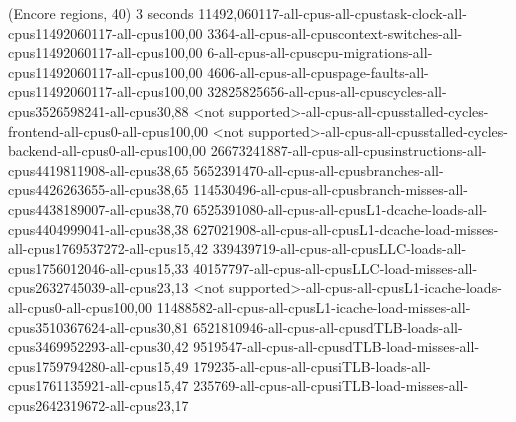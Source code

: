 (Encore regions, 40)
3 seconds
11492,060117-all-cpus-all-cpustask-clock-all-cpus11492060117-all-cpus100,00
3364-all-cpus-all-cpuscontext-switches-all-cpus11492060117-all-cpus100,00
6-all-cpus-all-cpuscpu-migrations-all-cpus11492060117-all-cpus100,00
4606-all-cpus-all-cpuspage-faults-all-cpus11492060117-all-cpus100,00
32825825656-all-cpus-all-cpuscycles-all-cpus3526598241-all-cpus30,88
<not supported>-all-cpus-all-cpusstalled-cycles-frontend-all-cpus0-all-cpus100,00
<not supported>-all-cpus-all-cpusstalled-cycles-backend-all-cpus0-all-cpus100,00
26673241887-all-cpus-all-cpusinstructions-all-cpus4419811908-all-cpus38,65
5652391470-all-cpus-all-cpusbranches-all-cpus4426263655-all-cpus38,65
114530496-all-cpus-all-cpusbranch-misses-all-cpus4438189007-all-cpus38,70
6525391080-all-cpus-all-cpusL1-dcache-loads-all-cpus4404999041-all-cpus38,38
627021908-all-cpus-all-cpusL1-dcache-load-misses-all-cpus1769537272-all-cpus15,42
339439719-all-cpus-all-cpusLLC-loads-all-cpus1756012046-all-cpus15,33
40157797-all-cpus-all-cpusLLC-load-misses-all-cpus2632745039-all-cpus23,13
<not supported>-all-cpus-all-cpusL1-icache-loads-all-cpus0-all-cpus100,00
11488582-all-cpus-all-cpusL1-icache-load-misses-all-cpus3510367624-all-cpus30,81
6521810946-all-cpus-all-cpusdTLB-loads-all-cpus3469952293-all-cpus30,42
9519547-all-cpus-all-cpusdTLB-load-misses-all-cpus1759794280-all-cpus15,49
179235-all-cpus-all-cpusiTLB-loads-all-cpus1761135921-all-cpus15,47
235769-all-cpus-all-cpusiTLB-load-misses-all-cpus2642319672-all-cpus23,17
